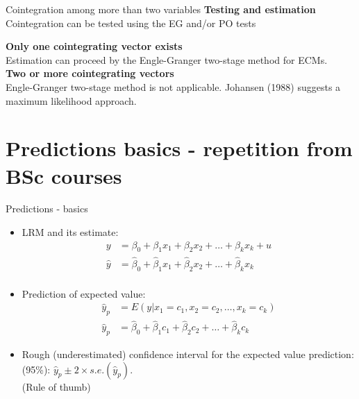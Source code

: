\documentclass{beamer}
\begin{document}

\begin{frame}{Cointegration among more than two variables}
\textbf{Testing and estimation}\\
Cointegration can be tested using the EG and/or PO tests

\hspace{0.3cm}

\textbf{Only one cointegrating vector exists}\\
Estimation can proceed by the Engle-Granger two-stage method for ECMs. \\ 
\vspace{0.3cm}
\textbf{Two or more cointegrating vectors}\\
Engle-Granger two-stage method is not applicable. Johansen (1988) suggests a maximum likelihood approach. 
\end{frame}


\section{Predictions basics - repetition from BSc courses}

\begin{frame}{Predictions - basics}
\begin{itemize}
\item LRM and its estimate:
\begin{align}\nonumber
y & = \beta_0 + \beta_1 x_1 +\beta_2 x_2 + \dots + \beta_k x_k + u\\ \nonumber
\hat{y} & = \hat{\beta}_0 + \hat{\beta}_1 x_1 +\hat{\beta}_2 x_2 + \dots + \hat{\beta}_k x_k \\ \nonumber
\end{align}
\item Prediction of expected value: 
\begin{align}\nonumber
\hat{y}_p & = E(y|x_1 = c_1, x_2 = c_2,\dots,x_k = c_k)\\ \nonumber
\hat{y}_p & = \hat{\beta}_0 + \hat{\beta}_1 c_1 +\hat{\beta}_2 c_2 + \dots + \hat{\beta}_k c_k  \nonumber
\end{align}
\item Rough (underestimated) confidence interval for the expected value prediction: (95\%): $\hat{y}_p \pm 2 \times \textit{s.e.}(\hat{y}_p)$. \\ (Rule of thumb) 
\end{itemize}
\end{frame}
\end{document}
